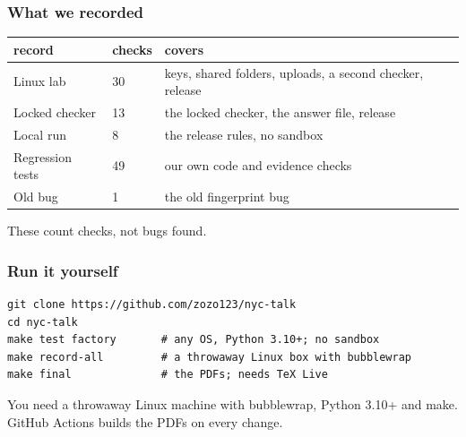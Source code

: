 \documentclass[aspectratio=169,11pt]{beamer}
\newcommand{\track}{00 / FOUR DOORS}
\newcommand{\scope}[1]{\par\vspace{1mm}{\color{dim}\fontsize{8}{9.6}\selectfont #1}\par}
\newcommand{\takeaway}[1]{\par\vfill{\fontsize{13}{16}\selectfont #1}\par}
\newcommand{\tablefont}{\fontsize{9.6}{12}\selectfont\renewcommand{\arraystretch}{1.25}\setlength{\tabcolsep}{3pt}}
\begin{document}
\renewcommand{\track}{A6 / RECORDINGS}
\begin{frame}[t]
\frametitle{What we recorded}
{\tablefont\begin{tabular}{@{}L{.25\textwidth}L{.10\textwidth}L{.59\textwidth}@{}}
\textcolor{acid}{record} & \textcolor{acid}{checks} & \textcolor{acid}{covers}\\\midrule
Linux lab & 30 & keys, shared folders, uploads, a second checker, release\\
Locked checker & 13 & the locked checker, the answer file, release\\
Local run & 8 & the release rules, no sandbox\\
Regression tests & 49 & our own code and evidence checks\\
Old bug & 1 & the old fingerprint bug\\
\end{tabular}}
\takeaway{These count checks, not bugs found.}
\end{frame}

\renewcommand{\track}{A7 / RUN IT}
\begin{frame}[t,fragile]
\frametitle{Run it yourself}
\begin{lstlisting}
git clone https://github.com/zozo123/nyc-talk
cd nyc-talk
make test factory       # any OS, Python 3.10+; no sandbox
make record-all         # a throwaway Linux box with bubblewrap
make final              # the PDFs; needs TeX Live
\end{lstlisting}
\vspace{2mm}
{\fontsize{10}{13}\selectfont You need a throwaway Linux machine with bubblewrap, Python 3.10+ and make. GitHub Actions builds the PDFs on every change.\par}
\scope{Sandbox: bubblewrap.}
\end{frame}
\end{document}
